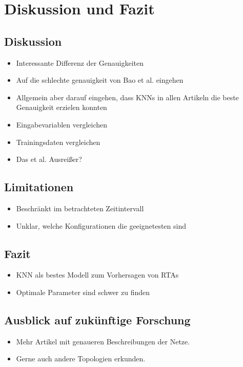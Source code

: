 \documentclass{scrartcl}
\begin{document}
\section{Diskussion und Fazit}

\subsection{Diskussion}

\begin{itemize}
   \item{Interessante Differenz der Genauigkeiten}
   \item{Auf die schlechte genauigkeit von Bao et al. eingehen}
   \item{Allgemein aber darauf eingehen, dass KNNs in allen Artikeln die beste Genauigkeit erzielen konnten}
   \item{Eingabevariablen vergleichen}
   \item{Trainingsdaten vergleichen}
   \item{Das et al. Ausreißer?}
\end{itemize}

\subsection{Limitationen}

\begin{itemize}
   \item{Beschränkt im betrachteten Zeitintervall}
   \item{Unklar, welche Konfigurationen die geeignetesten sind}
\end{itemize}

\subsection{Fazit}

\begin{itemize}
   \item{KNN als bestes Modell zum Vorhersagen von RTAs}
   \item{Optimale Parameter sind schwer zu finden}
\end{itemize}

\subsection{Ausblick auf zukünftige Forschung}

\begin{itemize}
   \item{Mehr Artikel mit genaueren Beschreibungen der Netze.}
   \item{Gerne auch andere Topologien erkunden.}
\end{itemize}

\printbibliography
\listoffigures
\listoftables
\end{document}
